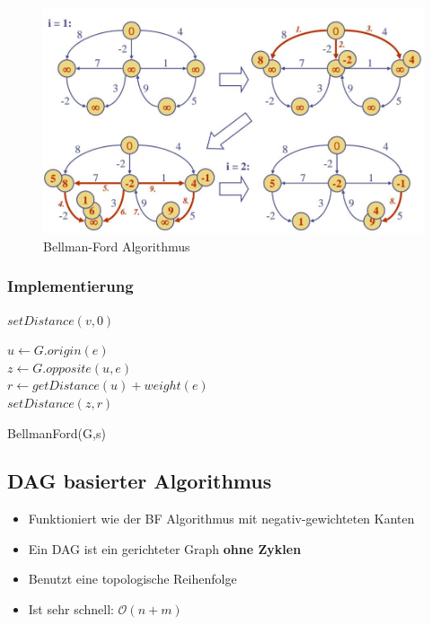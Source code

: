 \begin{figure}[h]
\centering
\includegraphics[width=0.9\linewidth]{images/bellman-ford}
\caption{Bellman-Ford Algorithmus}
\label{fig:bellman-ford}
\end{figure}


\subsubsection{Implementierung}
\begin{algorithm}[H]
	{
		{
			
			$setDistance(v,0)$ 
		}
		 {
			$u \leftarrow G.origin(e)$ \\	
			$z \leftarrow G.opposite(u, e)$ \\
			$r \leftarrow getDistance(u) + weight(e)$ \\
			{
				$setDistance(z,r)$
			}
		} 
	}
\caption{BellmanFord(G,s)}
\end{algorithm}

\subsection{DAG basierter Algorithmus}
\begin{itemize}
	\item Funktioniert wie der BF Algorithmus mit negativ-gewichteten Kanten
	\item Ein DAG ist ein gerichteter Graph \textbf{ohne Zyklen}
	\item Benutzt eine topologische Reihenfolge
	\item Ist sehr schnell: $\mathcal{O}(n+m)$
\end{itemize}

